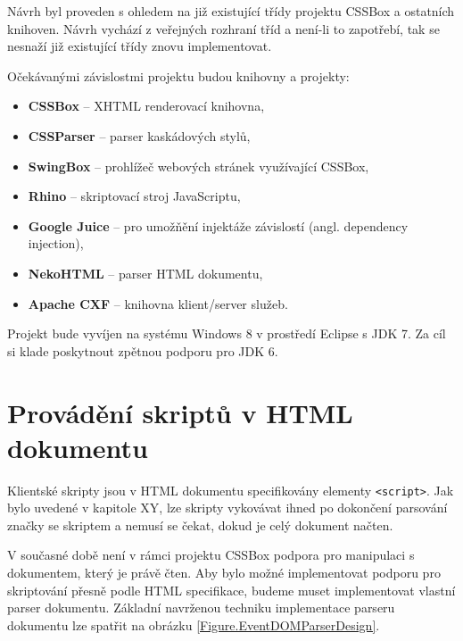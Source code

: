 Návrh byl proveden s ohledem na již existující třídy projektu CSSBox a ostatních knihoven. Návrh vychází z veřejných rozhraní tříd a není-li to zapotřebí, tak se nesnaží již existující třídy znovu implementovat. 

\bigskip \noindent Očekávanými závislostmi projektu budou knihovny a projekty:

\begin{itemize}
  \item \textbf{CSSBox} -- XHTML renderovací knihovna,
  \item \textbf{CSSParser} -- parser kaskádových stylů,
  \item \textbf{SwingBox} -- prohlížeč webových stránek využívající CSSBox,
  \item \textbf{Rhino} -- skriptovací stroj JavaScriptu,
  \item \textbf{Google Juice} -- pro umožňění injektáže závislostí (angl. dependency injection),  
  \item \textbf{NekoHTML} -- parser HTML dokumentu,
  \item \textbf{Apache CXF} -- knihovna klient/server služeb.
\end{itemize}

Projekt bude vyvíjen na systému Windows 8 v prostředí Eclipse s JDK 7. Za cíl si klade poskytnout zpětnou podporu pro JDK 6.
 
\section{Provádění skriptů v HTML dokumentu}
\label{Chapter.Design.ScriptsInHTML}

Klientské skripty jsou v HTML dokumentu specifikovány elementy \texttt{<script>}. Jak bylo uvedené v kapitole XY, lze skripty vykovávat ihned po dokončení parsování značky se skriptem a nemusí se čekat, dokud je celý dokument načten. 

V současné době není v rámci projektu CSSBox podpora pro manipulaci s dokumentem, který je právě čten. Aby bylo možné implementovat podporu pro skriptování přesně podle HTML specifikace, budeme muset implementovat vlastní parser dokumentu. Základní navrženou techniku implementace parseru dokumentu lze spatřit na obrázku \ref{Figure.EventDOMParserDesign}.

